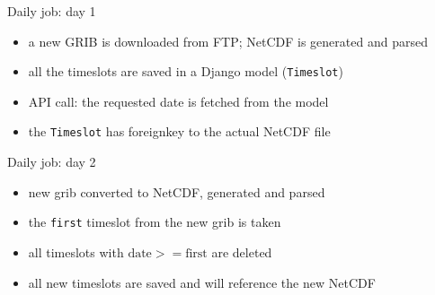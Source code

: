 \documentclass[xcolor=svgnames]{beamer}
\begin{document}
    \begin{frame}{Daily job: day 1}
        \begin{itemize}
            \item a new GRIB is downloaded from FTP; NetCDF is generated and parsed
            \item all the timeslots are saved in a Django model (\texttt{Timeslot})
            \item API call: the requested date is fetched from the model
            \item the \texttt{Timeslot} has foreignkey to the actual NetCDF file
        \end{itemize}
        \vspace{0.05\textwidth}
        \startchronology[startyear=0,stopyear=80]
        \stopchronology
    \end{frame}

    \begin{frame}{Daily job: day 2}
        \begin{itemize}
            \item new grib converted to NetCDF, generated and parsed
            \item the \texttt{first} timeslot from the new grib is taken
            \item all timeslots with $\text{date}>=\text{first}$ are deleted
            \item all new timeslots are saved and will reference the new NetCDF
        \end{itemize}
        \vspace{0.05\textwidth}
        \startchronology[startyear=0,stopyear=80]
        \stopchronology
    \end{frame}

\end{document}
